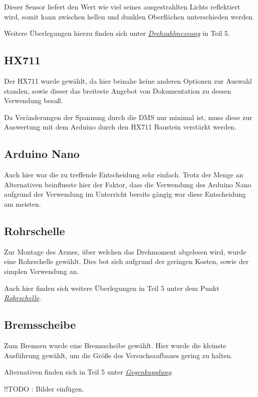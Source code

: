 Dieser Sensor liefert den Wert wie viel seines ausgestrahlten Lichts reflektiert wird, somit kann zwischen hellen und dunklen Oberflächen unterschieden werden.

Weitere Überlegungen hierzu finden sich unter \hyperref[drehzahlmessung]{\textit{Drehzahlmessung}} in Teil 5.

\subsection{HX711}

Der HX711 wurde gewählt, da hier beinahe keine anderen Optionen zur Auswahl standen, sowie dieser das breiteste Angebot von Dokumentation zu dessen Verwendung besaß.

Da Veränderungen der Spannung durch die DMS nur minimal ist, muss diese zur Auswertung mit dem Arduino durch den HX711 Baustein verstärkt werden.

\subsection{Arduino Nano}

Auch hier war die zu treffende Entscheidung sehr einfach.
Trotz der Menge an Alternativen beinflusste hier der Faktor, dass die Verwendung des Arduino Nano aufgrund der Verwendung im Unterricht bereits gängig war diese Entscheidung am meisten.

\subsection{Rohrschelle}

Zur Montage des Armes, über welchen das Drehmoment abgelesen wird, wurde eine Rohrschelle gewählt.
Dies bot sich aufgrund der geringen Kosten, sowie der simplen Verwendung an.

Auch hier finden sich weitere Überlegungen in Teil 5 unter dem Punkt \hyperref[rohrschelle]{\textit{Rohrschelle}}.

\subsection{Bremsscheibe}

Zum Bremsen wurde eine Bremsscheibe gewählt.
Hier wurde die kleinste Ausführung gewählt, um die Größe des Versuchsaufbaues gering zu halten.

Alternativen finden sich in Teil 5 unter \hyperref[gegenkupplung]{\textit{Gegenkupplung}}.



!!TODO : Bilder einfügen.